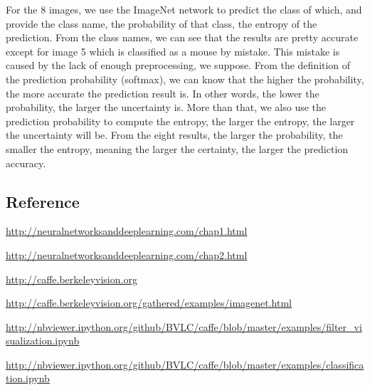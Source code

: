 \documentclass[12pt,a4paper,twoside]{article}
\begin{document}
For the 8 images, we use the ImageNet network to predict the class of which, and provide the class name, the probability of that class, the entropy of the prediction. From the class names, we can see that the results are pretty accurate except for image 5 which is classified as a mouse by mistake. This mistake is caused by the lack of enough preprocessing, we suppose. From the definition of the prediction   probability (softmax), we can know that the higher the probability, the more accurate the prediction  result is. In other words, the lower the probability, the larger the uncertainty is.  More than that, we also use the prediction probability to compute the entropy,  the larger the entropy, the larger the uncertainty will be.  From the eight results, the larger the probability, the smaller the entropy, meaning the larger the certainty, the larger the prediction accuracy.

\subsection*{Reference}


\url{http://neuralnetworksanddeeplearning.com/chap1.html}

\url{http://neuralnetworksanddeeplearning.com/chap2.html}

\url{http://caffe.berkeleyvision.org}

\url{http://caffe.berkeleyvision.org/gathered/examples/imagenet.html}

\url{http://nbviewer.ipython.org/github/BVLC/caffe/blob/master/examples/filter_visualization.ipynb}

\url{http://nbviewer.ipython.org/github/BVLC/caffe/blob/master/examples/classification.ipynb}
\end{document}
